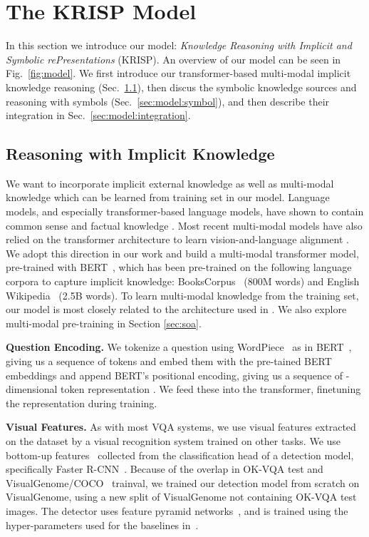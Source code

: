 \documentclass[final]{cvpr}
\providecommand{\ModelName}{KRISP\xspace}
\providecommand{\ModelNameLong}{Knowledge Reasoning with Implicit and  Symbolic rePresentations\xspace}
\providecommand{\myparagraph}[1]{\noindent\textbf{#1.}}
\providecommand{\sectionvspace}{\vspace{-0cm}}
\begin{document}
\sectionvspace
\section{The \ModelName Model}
\sectionvspace
In this section we introduce our model: \emph{\ModelNameLong} (\ModelName). An overview of our model can be seen in Fig.~\ref{fig:model}. We first introduce our transformer-based multi-modal implicit knowledge reasoning (Sec.~\ref{sec:model:implicit}), then discus the symbolic knowledge sources and reasoning with symbols (Sec.~\ref{sec:model:symbol}), and then describe their integration in Sec.~\ref{sec:model:integration}.

\sectionvspace
\subsection{Reasoning with Implicit Knowledge}
\label{sec:model:implicit}
\sectionvspace

\label{sec:VB}
We want to incorporate implicit external knowledge as well as multi-modal knowledge which can be learned from training set in our model.
Language models, and especially transformer-based language models, have shown to contain common sense and factual knowledge \cite{petroni19emnlp, jiang2020can}.
Most recent multi-modal models have also relied on the transformer architecture to learn vision-and-language alignment \cite{li2019visualbert,lu19vilbert}. 
We adopt this direction in our work and build a multi-modal transformer model, pre-trained with BERT~\cite{devlin19bert}, which has been pre-trained on the following language corpora to capture implicit knowledge: BooksCorpus~\cite{zhu15aligning} (800M words) and English Wikipedia~\cite{wikipedia} (2.5B words).
To learn multi-modal knowledge from the training set, our model is most closely related to the architecture used in \cite{li2019visualbert}. We also explore multi-modal pre-training in Section \ref{sec:soa}.

\myparagraph{Question Encoding}
We tokenize a question  using WordPiece~\cite{wu2016google} as in BERT~\cite{devlin19bert}, giving us a sequence of  tokens and embed them with the pre-tained BERT embeddings and append BERT's positional encoding, giving us a sequence of -dimensional token representation . We feed these into the transformer, finetuning the representation during training.

\myparagraph{Visual Features}
As with most VQA systems, we use visual features extracted on the dataset by a visual recognition system trained on other tasks.
We use bottom-up features~\cite{anderson2018bottom} collected from the classification head of a detection model, specifically Faster R-CNN~\cite{renNIPS15fasterrcnn}. Because of the overlap in OK-VQA test and VisualGenome/COCO~\cite{LinMBHPRDZ14} trainval, we trained our detection model from scratch on VisualGenome, using a new split of VisualGenome not containing OK-VQA test images. The detector uses feature pyramid networks~\cite{lin2017feature}, and is trained using the hyper-parameters used for the baselines in~\cite{jiang2020defense}. 
\end{document}
